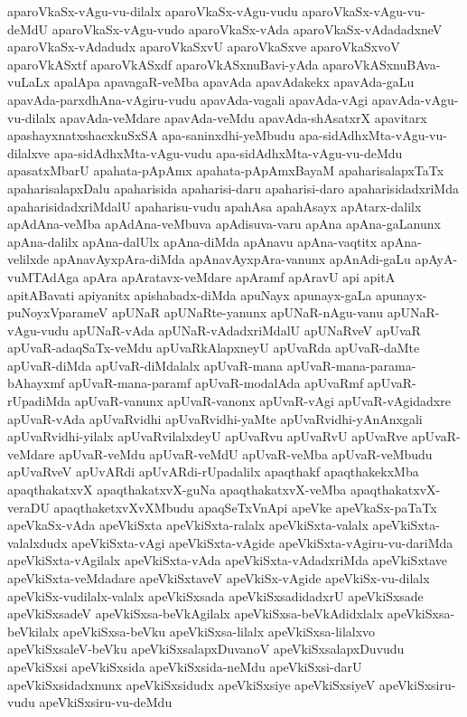 {aparoVkaSx-vAgu-vu-dilalx
aparoVkaSx-vAgu-vudu
aparoVkaSx-vAgu-vu-deMdU
aparoVkaSx-vAgu-vudo
aparoVkaSx-vAda
aparoVkaSx-vAdadadxneV
aparoVkaSx-vAdadudx
aparoVkaSxvU
aparoVkaSxve
aparoVkaSxvoV
aparoVkASxtf
aparoVkASxdf
aparoVkASxnuBavi-yAda
aparoVkASxnuBAva-vuLaLx
apalApa
apavagaR-veMba
apavAda
apavAdakekx
apavAda-gaLu
apavAda-parxdhAna-vAgiru-vudu
apavAda-vagali
apavAda-vAgi
apavAda-vAgu-vu-dilalx
apavAda-veMdare
apavAda-veMdu
apavAda-shAsatxrX
apavitarx
apashayxnatxshacxkuSxSA
apa-saninxdhi-yeMbudu
apa-sidAdhxMta-vAgu-vu-dilalxve
apa-sidAdhxMta-vAgu-vudu
apa-sidAdhxMta-vAgu-vu-deMdu
apasatxMbarU
apahata-pApAmx
apahata-pApAmxBayaM
apaharisalapxTaTx
apaharisalapxDalu
apaharisida
apaharisi-daru
apaharisi-daro
apaharisidadxriMda
apaharisidadxriMdalU
apaharisu-vudu
apahAsa
apahAsayx
apAtarx-dalilx
apAdAna-veMba
apAdAna-veMbuva
apAdisuva-varu
apAna
apAna-gaLanunx
apAna-dalilx
apAna-dalUlx
apAna-diMda
apAnavu
apAna-vaqtitx
apAna-velilxde
apAnavAyxpAra-diMda
apAnavAyxpAra-vanunx
apAnAdi-gaLu
apAyA-vuMTAdAga
apAra
apAratavx-veMdare
apAramf
apAravU
api
apitA
apitABavati
apiyanitx
apishabadx-diMda
apuNayx
apunayx-gaLa
apunayx-puNoyxVparameV
apUNaR
apUNaRte-yanunx
apUNaR-nAgu-vanu
apUNaR-vAgu-vudu
apUNaR-vAda
apUNaR-vAdadxriMdalU
apUNaRveV
apUvaR
apUvaR-adaqSaTx-veMdu
apUvaRkAlapxneyU
apUvaRda
apUvaR-daMte
apUvaR-diMda
apUvaR-diMdalalx
apUvaR-mana
apUvaR-mana-parama-bAhayxmf
apUvaR-mana-paramf
apUvaR-modalAda
apUvaRmf
apUvaR-rUpadiMda
apUvaR-vanunx
apUvaR-vanonx
apUvaR-vAgi
apUvaR-vAgidadxre
apUvaR-vAda
apUvaRvidhi
apUvaRvidhi-yaMte
apUvaRvidhi-yAnAnxgali
apUvaRvidhi-yilalx
apUvaRvilalxdeyU
apUvaRvu
apUvaRvU
apUvaRve
apUvaR-veMdare
apUvaR-veMdu
apUvaR-veMdU
apUvaR-veMba
apUvaR-veMbudu
apUvaRveV
apUvARdi
apUvARdi-rUpadalilx
apaqthakf
apaqthakekxMba
apaqthakatxvX
apaqthakatxvX-guNa
apaqthakatxvX-veMba
apaqthakatxvX-veraDU
apaqthaketxvXvXMbudu
apaqSeTxVnApi
apeVke
apeVkaSx-paTaTx
apeVkaSx-vAda
apeVkiSxta
apeVkiSxta-ralalx
apeVkiSxta-valalx
apeVkiSxta-valalxdudx
apeVkiSxta-vAgi
apeVkiSxta-vAgide
apeVkiSxta-vAgiru-vu-dariMda
apeVkiSxta-vAgilalx
apeVkiSxta-vAda
apeVkiSxta-vAdadxriMda
apeVkiSxtave
apeVkiSxta-veMdadare
apeVkiSxtaveV
apeVkiSx-vAgide
apeVkiSx-vu-dilalx
apeVkiSx-vudilalx-valalx
apeVkiSxsada
apeVkiSxsadidadxrU
apeVkiSxsade
apeVkiSxsadeV
apeVkiSxsa-beVkAgilalx
apeVkiSxsa-beVkAdidxlalx
apeVkiSxsa-beVkilalx
apeVkiSxsa-beVku
apeVkiSxsa-lilalx
apeVkiSxsa-lilalxvo
apeVkiSxsaleV-beVku
apeVkiSxsalapxDuvanoV
apeVkiSxsalapxDuvudu
apeVkiSxsi
apeVkiSxsida
apeVkiSxsida-neMdu
apeVkiSxsi-darU
apeVkiSxsidadxnunx
apeVkiSxsidudx
apeVkiSxsiye
apeVkiSxsiyeV
apeVkiSxsiru-vudu
apeVkiSxsiru-vu-deMdu
}

